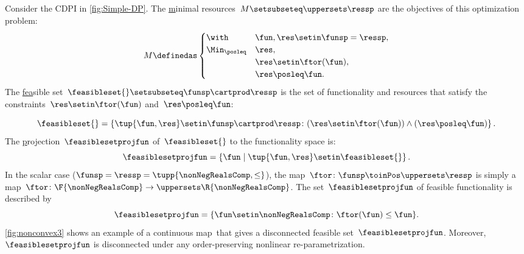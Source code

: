 \begin{example}
    \label{exa:one}
    Consider the CDPI in \cref{fig:Simple-DP}.
    The \uline{m}inimal resources~$M\setsubseteq\uppersets \ressp$ are the objectives of this optimization problem:
    \begin{equation*}
        M\definedas\begin{cases}
            \with          & \fun,\res\setin\funsp=\ressp, \\
            \Min_{\posleq} & \res,                         \\
                           & \res\setin\ftor(\fun),        \\
                           & \res\posleq\fun.
        \end{cases}
    \end{equation*}
    The \uline{fea}sible set~$\feasibleset{}\setsubseteq\funsp\cartprod\ressp$ is the set of functionality and resources that satisfy the constraints~$\res\setin\ftor(\fun)$ and~$\res\posleq\fun$:

    \begin{equation}
        \feasibleset{}=\left\{ \tup{\fun,\res}\setin\funsp\cartprod\ressp\colon (\res\setin\ftor(\fun))\wedge(\res\posleq\fun)\right\} .
        \label{eq:feasible}
    \end{equation}
    The \uline{p}rojection~$\feasiblesetprojfun$ of~$\feasibleset{}$ to the functionality space is:
    \begin{equation*}
        \feasiblesetprojfun=\left\{ \fun\mid\tup{\fun,\res} \setin\feasibleset{}\right\}.
    \end{equation*}
    In the scalar case ($\funsp=\ressp=\tupp{\nonNegRealsComp,\leq}$), the map~$\ftor\colon\funsp\toinPos\uppersets \ressp$ is simply a map~$\ftor\colon\F{\nonNegRealsComp}\to \uppersets\R{\nonNegRealsComp}$.
    The set~$\feasiblesetprojfun$ of feasible functionality is described by
    \begin{equation}
        \feasiblesetprojfun=\{\fun\setin\nonNegRealsComp\colon \ftor(\fun)\leq\fun\}.
        \label{eq:Pfeasible}
    \end{equation}
    \cref{fig:nonconvex3} shows an example of a continuous map~\ftor that gives a disconnected feasible set~$\feasiblesetprojfun$.
    Moreover,~$\feasiblesetprojfun$ is disconnected under any order-preserving nonlinear re-parametrization.

\end{example}
